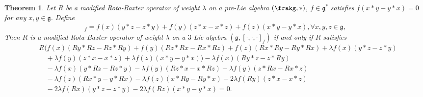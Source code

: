 \documentclass[12pt]{amsart}
\newtheorem{theorem}{Theorem}[section]
\theoremstyle{definition}
\begin{document}
\begin{theorem} \label{4.8} Let $R$ be a modified Rota-Baxter operator of weight $\lambda$ on a pre-Lie algebra $(\frakg, \ast)$, $f\in \mathfrak{g}^{\ast}$ satisfies $f(x\ast y-y\ast x) = 0$ for any  $x, y \in  \mathfrak{g}$. Define
\begin{align*}
[x, y, z]_f = f(x)(y\ast z-z\ast y)+ f(y)(z\ast x-x\ast z) + f(z)(x\ast y-y\ast x), \forall x, y, z \in \mathfrak{g},
\end{align*}
Then  $R$ is  a   modified Rota-Baxter operator of weight $\lambda$ on a $3$-Lie algebra $(\mathfrak{g}, [\cdot,\cdot,\cdot]_f)$ if and only if  $R$ satisfies
\begin{align*}
&R\Big(f(x)(Ry\ast Rz-Rz\ast Ry)+f(y)(Rz\ast Rx-Rx\ast Rz)+f(z)(Rx\ast Ry-Ry\ast Rx)+\lambda f(x)(y\ast z-z\ast y) \\
&\quad +\lambda f(y)(z\ast x-x\ast z)+ \lambda f(z)(x\ast y-y\ast x)\Big)-\lambda f(x)(Ry\ast z-z\ast Ry)\\
&\quad-\lambda f(x)(y\ast Rz-Rz\ast y) - \lambda f(y)(Rz\ast x-x\ast Rz)-\lambda  f(y)(z\ast Rx-Rx\ast z)\\
&\quad-\lambda f(z)(Rx\ast y-y\ast Rx)-\lambda f(z)(x\ast Ry-Ry\ast x)-2\lambda f(Ry)(z\ast x-x\ast z)\\
&\quad-2\lambda f(Rx)(y\ast z-z\ast y)-2\lambda f(Rz)(x\ast y-y\ast x)=0.
\end{align*}
\end{theorem}
\end{document}
